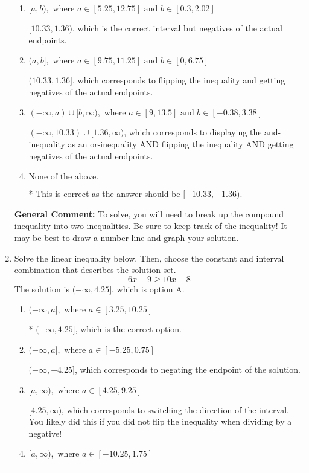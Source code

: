 \documentclass{extbook}[14pt]
\newcommand{\litem}[1]{\item #1

\rule{\textwidth}{0.4pt}}
\begin{document}
\begin{enumerate}
{\begin{enumerate}[label=\Alph*.]
$(-\infty, 10.33] \cup (1.36, \infty)$, which corresponds to displaying the and-inequality as an or-inequality and getting negatives of the actual endpoints.
\item \( [a, b), \text{ where } a \in [5.25, 12.75] \text{ and } b \in [0.3, 2.02] \)

$[10.33, 1.36)$, which is the correct interval but negatives of the actual endpoints.
\item \( (a, b], \text{ where } a \in [9.75, 11.25] \text{ and } b \in [0, 6.75] \)

$(10.33, 1.36]$, which corresponds to flipping the inequality and getting negatives of the actual endpoints.
\item \( (-\infty, a) \cup [b, \infty), \text{ where } a \in [9, 13.5] \text{ and } b \in [-0.38, 3.38] \)

$(-\infty, 10.33) \cup [1.36, \infty)$, which corresponds to displaying the and-inequality as an or-inequality AND flipping the inequality AND getting negatives of the actual endpoints.
\item \( \text{None of the above.} \)

* This is correct as the answer should be $[-10.33, -1.36)$.
\end{enumerate}

\textbf{General Comment:} To solve, you will need to break up the compound inequality into two inequalities. Be sure to keep track of the inequality! It may be best to draw a number line and graph your solution.
}
\litem{
Solve the linear inequality below. Then, choose the constant and interval combination that describes the solution set.
\[ 6x + 9 \geq 10x -8 \]The solution is \( (-\infty, 4.25] \), which is option A.\begin{enumerate}[label=\Alph*.]
\item \( (-\infty, a], \text{ where } a \in [3.25, 10.25] \)

* $(-\infty, 4.25]$, which is the correct option.
\item \( (-\infty, a], \text{ where } a \in [-5.25, 0.75] \)

 $(-\infty, -4.25]$, which corresponds to negating the endpoint of the solution.
\item \( [a, \infty), \text{ where } a \in [4.25, 9.25] \)

 $[4.25, \infty)$, which corresponds to switching the direction of the interval. You likely did this if you did not flip the inequality when dividing by a negative!
\item \( [a, \infty), \text{ where } a \in [-10.25, 1.75] \)


\end{enumerate}}
\end{enumerate}
\end{document}
